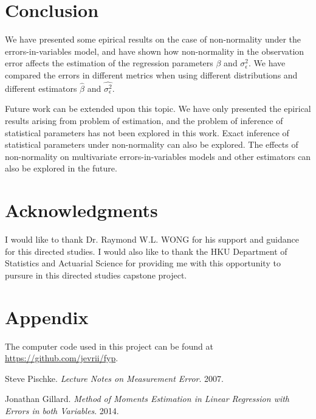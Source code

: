 \documentclass{article}
\begin{document}
\section{Conclusion}

We have presented some epirical results on the case of non-normality under the errors-in-variables model,
and have shown how non-normality in the observation error affects the estimation of the regression parameters $\beta$ and $\sigma^2_\epsilon$. 
We have compared the errors in different metrics when using different distributions and different estimators $\hat{\beta}$ and $\hat{\sigma^2_\epsilon}$.

Future work can be extended upon this topic.
We have only presented the epirical results arising from problem of estimation,
and the problem of inference of statistical parameters has not been explored in this work.
Exact inference of statistical parameters under non-normality can also be explored.
The effects of non-normality on multivariate errors-in-variables models and other estimators can also be explored in the future.

\section{Acknowledgments}

I would like to thank Dr. Raymond W.L. WONG for his support and guidance for this directed studies.
I would also like to thank the HKU Department of Statistics and Actuarial Science for providing me with this opportunity to pursure in this directed studies capstone project.

\section{Appendix}

The computer code used in this project can be found at \url{https://github.com/jevrii/fyp}.



\begin{thebibliography}{9}

    Steve Pischke.
    \textit{Lecture Notes on Measurement Error}.
    2007.

    Jonathan Gillard.
    \textit{Method of Moments Estimation in Linear Regression with Errors in both Variables}.
    2014.

\end{thebibliography}
\end{document}
